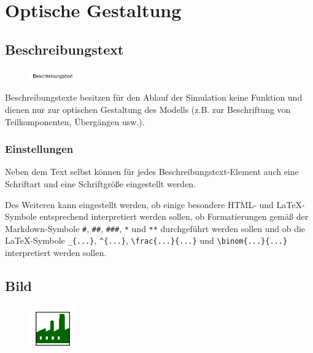 \chapter{Optische Gestaltung}

\section{Beschreibungstext}
\label{ref:ModelElementText}

\begin{figure}
\vspace{-22pt}
\includegraphics[width=2cm]{imageModelElementText.png}
\vspace{-22pt}
\end{figure}

Beschreibungstexte besitzen für den Ablauf der Simulation keine Funktion und dienen nur zur optischen Gestaltung des Modells
(z.B. zur Beschriftung von Teilkomponenten, Übergängen usw.).

\subsection*{Einstellungen}

Neben dem Text selbst können für jedes Beschreibungstext-Element auch eine Schriftart und eine Schriftgröße eingestellt werden.

Des Weiteren kann eingestellt werden, ob einige besondere HTML- und LaTeX-Symbole entsprechend
interpretiert werden sollen, ob Formatierungen gemäß der Markdown-Symbole \texttt{\#}, \texttt{\#\#}, \texttt{\#\#\#}, \texttt{*}
und \texttt{**} durchgeführt werden sollen und ob die LaTeX-Symbole \texttt{\_\{...\}}, \texttt{\^{}\{...\}},
\texttt{\textbackslash frac\{...\}\{...\}} und \texttt{\textbackslash binom\{...\}\{...\}} interpretiert werden sollen.


\section{Bild}
\label{ref:ModelElementImage}

\begin{figure}
\vspace{-22pt}
\includegraphics[width=2cm]{imageModelElementImage.png}
\vspace{-22pt}
\end{figure}

